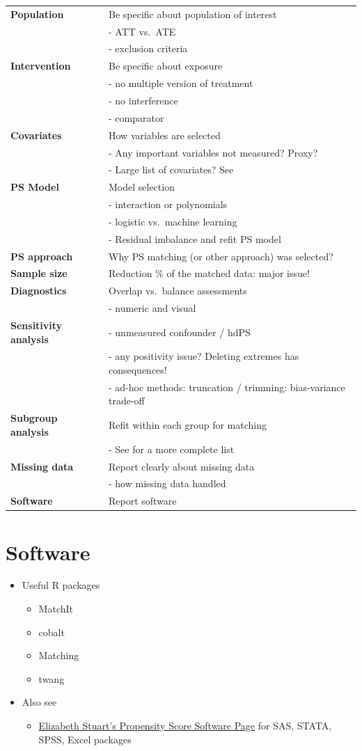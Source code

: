 \documentclass[
]{book}
\providecommand{\tightlist}{%
  \setlength{\itemsep}{0pt}\setlength{\parskip}{0pt}}
\begin{document}
\begin{longtable}[]{@{}ll@{}}
\toprule
\endhead
\textbf{Population} & Be specific about population of interest\tabularnewline
& - ATT vs.~ATE\tabularnewline
& - exclusion criteria\tabularnewline
\textbf{Intervention} & Be specific about exposure\tabularnewline
& - no multiple version of treatment\tabularnewline
& - no interference\tabularnewline
& - comparator\tabularnewline
\textbf{Covariates} & How variables are selected\tabularnewline
& - Any important variables not measured? Proxy?\tabularnewline
& - Large list of covariates? See \citet{king2019propensity}\tabularnewline
\textbf{PS Model} & Model selection\tabularnewline
& - interaction or polynomials\tabularnewline
& - logistic vs.~machine learning\tabularnewline
& - Residual imbalance and refit PS model\tabularnewline
\textbf{PS approach} & Why PS matching (or other approach) was selected?\tabularnewline
\textbf{Sample size} & Reduction \% of the matched data: major issue!\tabularnewline
\textbf{Diagnostics} & Overlap vs.~balance assessments\tabularnewline
& - numeric and visual\tabularnewline
\textbf{Sensitivity analysis} & - unmeasured confounder / hdPS\tabularnewline
& - any positivity issue? Deleting extremes has consequences!\tabularnewline
& - ad-hoc methods: truncation / trimming: bias-variance trade-off\tabularnewline
\textbf{Subgroup analysis} & Refit within each group for matching\tabularnewline
& - See \citet{ali2019propensity} for a more complete list\tabularnewline
\textbf{Missing data} & Report clearly about missing data\tabularnewline
& - how missing data handled\tabularnewline
\textbf{Software} & Report software\tabularnewline
\bottomrule
\end{longtable}

\hypertarget{software}{%
\section{Software}\label{software}}

\begin{itemize}
\tightlist
\item
  Useful R packages

  \begin{itemize}
  \tightlist
  \item
    MatchIt
  \item
    cobalt
  \item
    Matching
  \item
    twang
  \end{itemize}
\item
  Also see

  \begin{itemize}
  \tightlist
  \item
    \href{http://www.biostat.jhsph.edu/~estuart/propensityscoresoftware.html}{Elizabeth Stuart's Propensity Score Software Page} for SAS, STATA, SPSS, Excel packages
  \end{itemize}
\end{itemize}
\end{document}
